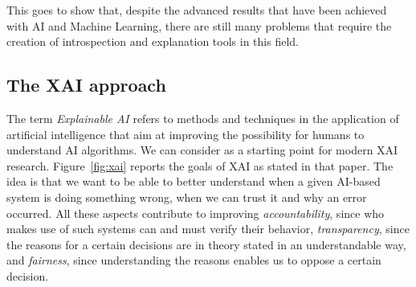 \documentclass[conference]{IEEEtran}
\newcommand{\cit}[1][]{\todo[tickmarkheight=0.2cm]{cit #1}}
\begin{document}
This goes to show that, despite the advanced results that have been achieved
with AI and Machine Learning, there are still many problems that require the
creation of introspection and explanation tools in this field.







\subsection{The XAI approach}
\label{sec:xai}

The term \textit{Explainable AI} refers to methods and techniques in the
application of artificial intelligence that aim at improving the possibility for
humans to understand AI algorithms. We can consider \citet{DARPA} as a starting
point for modern XAI research. Figure~\ref{fig:xai} reports the goals of XAI as
stated in that paper. The idea is that we want to be able to better understand
when a given AI-based system is doing something wrong, when we can trust it and
why an error occurred. All these aspects contribute to improving
\textit{accountability}, since who makes use of such systems can and must verify
their behavior, \textit{transparency}, since the reasons for a certain decisions
are in theory stated in an understandable way, and \textit{fairness}, since
understanding the reasons enables us to oppose a certain decision.
\end{document}
